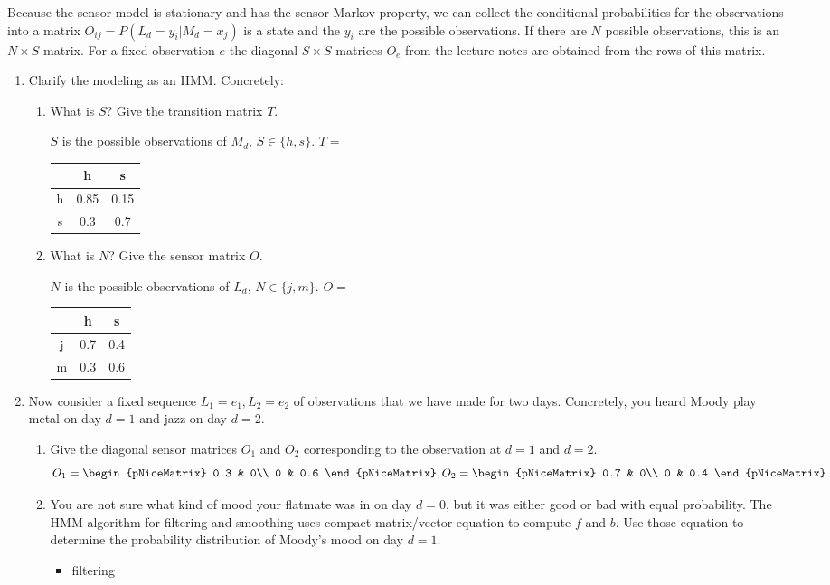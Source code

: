 \documentclass{homework}
\begin{document}
Because the sensor model is stationary and has the sensor Markov property, we can collect the conditional probabilities for the observations into a matrix $O_{ij}=P(L_d=y_i|M_d=x_j)$ is a state and the $y_i$ are the possible observations. If there are $N$ possible observations, this is an $N \times S$ matrix. For a fixed observation $e$ the diagonal $S\times S$ matrices $O_e$ from the lecture notes are obtained from the rows of this matrix.
\begin{enumerate}
	\item Clarify the modeling as an HMM. Concretely:
	\begin{enumerate}
		\item What is $S$? Give the transition matrix $T$.
		
		$S$ is the possible observations of $M_d$, $S\in \{h,s\}$.
		$T = $
		  \begin{tabular}{ | c | c | c| }
		    \hline
		    \diagbox[width=4em]{\footnotesize{$M_{d-1}$}}{\footnotesize{$M_d$}} & h & s \\ \hline
		    h & 0.85 & 0.15 \\ \hline
		    s & 0.3 & 0.7 \\
		    \hline
		  \end{tabular}
		\item What is $N$? Give the sensor matrix $O$.

		$N$ is the possible observations of $L_d$, $N\in \{j,m\}$.  
		$O = $
		  \begin{tabular}{ | c | c | c| }
		    \hline
		    \diagbox[width=3em]{\footnotesize{$L_d$}}{\footnotesize{$M_d$}} & h & s \\ \hline
		    j & 0.7 & 0.4 \\ \hline
		    m & 0.3 & 0.6 \\
		    \hline
		  \end{tabular}
	\end{enumerate}
	\item Now consider a fixed sequence $L_1 = e_1,L_2 = e_2$ of observations that we have made for two days. Concretely, you heard Moody play metal on day $d = 1$ and jazz on day $d = 2$.
	\begin{enumerate}
	\item Give the diagonal sensor matrices $O_1$ and $O_2$ corresponding to the observation at $d = 1$ and $d = 2$.
	$$
	O_1 = \begin{pNiceMatrix}
	0.3 & 0\\
	0 & 0.6
	\end{pNiceMatrix},
	O_2 = \begin{pNiceMatrix}
	0.7 & 0\\
	0 & 0.4
	\end{pNiceMatrix}
	$$
	\item You are not sure what kind of mood your flatmate was in on day $d = 0$, but it was either good or bad with equal probability. The HMM algorithm for filtering and smoothing uses compact matrix/vector equation to compute $f$ and $b$. Use those equation to determine the probability distribution of Moody's mood on day $d = 1$.
	\begin{itemize}
		\item filtering


\end{itemize}
\end{enumerate}
\end{enumerate}
\end{document}
